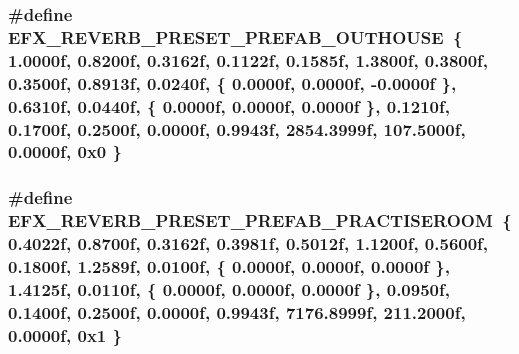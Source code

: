 \subsubsection[{\texorpdfstring{E\+F\+X\+\_\+\+R\+E\+V\+E\+R\+B\+\_\+\+P\+R\+E\+S\+E\+T\+\_\+\+P\+R\+E\+F\+A\+B\+\_\+\+O\+U\+T\+H\+O\+U\+SE}{EFX_REVERB_PRESET_PREFAB_OUTHOUSE}}]{\setlength{\rightskip}{0pt plus 5cm}\#define E\+F\+X\+\_\+\+R\+E\+V\+E\+R\+B\+\_\+\+P\+R\+E\+S\+E\+T\+\_\+\+P\+R\+E\+F\+A\+B\+\_\+\+O\+U\+T\+H\+O\+U\+SE~\{ 1.\+0000f, 0.\+8200f, 0.\+3162f, 0.\+1122f, 0.\+1585f, 1.\+3800f, 0.\+3800f, 0.\+3500f, 0.\+8913f, 0.\+0240f, \{ 0.\+0000f, 0.\+0000f, -\/0.\+0000f \}, 0.\+6310f, 0.\+0440f, \{ 0.\+0000f, 0.\+0000f, 0.\+0000f \}, 0.\+1210f, 0.\+1700f, 0.\+2500f, 0.\+0000f, 0.\+9943f, 2854.\+3999f, 107.\+5000f, 0.\+0000f, 0x0 \}}\hypertarget{efx-presets_8h_a59f30910713319c0ac2d17319269e986}{}\label{efx-presets_8h_a59f30910713319c0ac2d17319269e986}
\subsubsection[{\texorpdfstring{E\+F\+X\+\_\+\+R\+E\+V\+E\+R\+B\+\_\+\+P\+R\+E\+S\+E\+T\+\_\+\+P\+R\+E\+F\+A\+B\+\_\+\+P\+R\+A\+C\+T\+I\+S\+E\+R\+O\+OM}{EFX_REVERB_PRESET_PREFAB_PRACTISEROOM}}]{\setlength{\rightskip}{0pt plus 5cm}\#define E\+F\+X\+\_\+\+R\+E\+V\+E\+R\+B\+\_\+\+P\+R\+E\+S\+E\+T\+\_\+\+P\+R\+E\+F\+A\+B\+\_\+\+P\+R\+A\+C\+T\+I\+S\+E\+R\+O\+OM~\{ 0.\+4022f, 0.\+8700f, 0.\+3162f, 0.\+3981f, 0.\+5012f, 1.\+1200f, 0.\+5600f, 0.\+1800f, 1.\+2589f, 0.\+0100f, \{ 0.\+0000f, 0.\+0000f, 0.\+0000f \}, 1.\+4125f, 0.\+0110f, \{ 0.\+0000f, 0.\+0000f, 0.\+0000f \}, 0.\+0950f, 0.\+1400f, 0.\+2500f, 0.\+0000f, 0.\+9943f, 7176.\+8999f, 211.\+2000f, 0.\+0000f, 0x1 \}}\hypertarget{efx-presets_8h_ac5e6666e90ef33af0813c7f2ea1985e8}{}\label{efx-presets_8h_ac5e6666e90ef33af0813c7f2ea1985e8}
